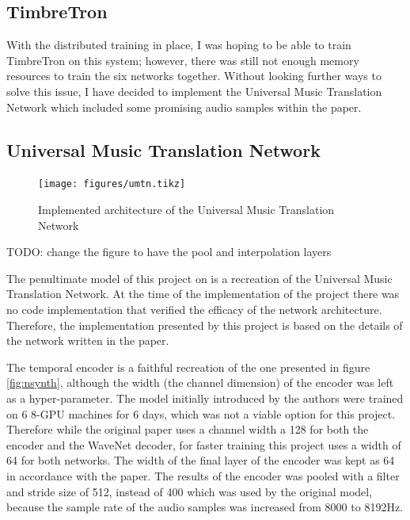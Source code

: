 \documentclass[12pt,a4paper,]{report}
\begin{document}
\hypertarget{timbretron-1}{%
\subsection{TimbreTron}\label{timbretron-1}}

With the distributed training in place, I was hoping to be able to train
TimbreTron on this system; however, there was still not enough memory
resources to train the six networks together. Without looking further
ways to solve this issue, I have decided to implement the Universal
Music Translation Network which included some promising audio samples
within the paper.

\hypertarget{universal-music-translation-network-1}{%
\subsection{Universal Music Translation
Network}\label{universal-music-translation-network-1}}

\begin{figure}[h]
    \texttt{[image: figures/umtn.tikz]}
\centering 
\caption{Implemented architecture of the Universal Music Translation Network \label{fig:umtn}}
\end{figure}

TODO: change the figure to have the pool and interpolation layers

The penultimate model of this project on is a recreation of the
Universal Music Translation Network. At the time of the implementation
of the project there was no code implementation that verified the
efficacy of the network architecture. Therefore, the implementation
presented by this project is based on the details of the network written
in the paper.

The temporal encoder is a faithful recreation of the one presented in
figure \ref{fig:nsynth}, although the width (the channel dimension) of
the encoder was left as a hyper-parameter. The model initially
introduced by the authors were trained on 6 8-GPU machines for 6 days,
which was not a viable option for this project. Therefore while the
original paper uses a channel width a 128 for both the encoder and the
WaveNet decoder, for faster training this project uses a width of 64 for
both networks. The width of the final layer of the encoder was kept as
64 in accordance with the paper. The results of the encoder was pooled
with a filter and stride size of 512, instead of 400 which was used by
the original model, because the sample rate of the audio samples was
increased from 8000 to 8192Hz.
\end{document}
